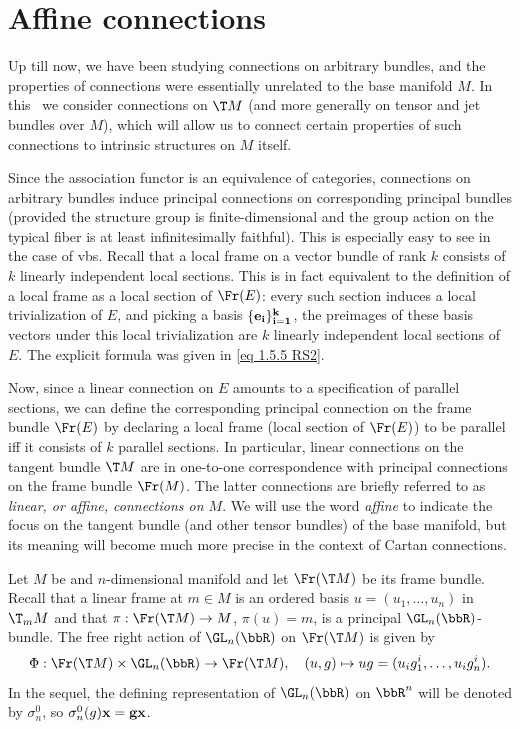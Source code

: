 \section{Affine connections}

Up till now, we have been studying connections on arbitrary bundles, and the properties of connections were essentially unrelated to the base manifold $M$. In this \sect\ we consider connections on $\T M$ (and more generally on tensor and jet bundles over $M$), which will allow us to connect certain properties of such connections to intrinsic structures on $M$ itself.

Since the association functor is an equivalence of categories, connections on arbitrary bundles induce principal connections on corresponding principal bundles (provided the structure group is finite-dimensional and the group action on the typical fiber is at least infinitesimally faithful). This is especially easy to see in the case of \glspl{vb}. Recall that a local frame on a vector bundle of rank $k$ consists of $k$ linearly independent local sections. This is in fact equivalent to the definition of a local frame as a local section of $\Fr(E)$: every such section induces a local trivialization of $E$, and picking a basis $\{\bf{e}_i\}_{i=1}^k$, the preimages of these basis vectors under this local trivialization are $k$ linearly independent local sections of $E$. The explicit formula was given in \eqref{eq 1.5.5 RS2}.

Now, since a linear connection on $E$ amounts to a specification of parallel sections, we can define the corresponding principal connection on the frame bundle $\Fr(E)$ by declaring a local frame (local section of $\Fr(E)$) to be parallel iff it consists of $k$ parallel sections. In particular, linear connections on the tangent bundle $\T M$ are in one-to-one correspondence with principal connections on the frame bundle $\Fr(M)$. The latter connections are briefly referred to as \emph{linear, or affine, connections on $M$}. We will use the word \emph{affine} to indicate the focus on the tangent bundle (and other tensor bundles) of the base manifold, but its meaning will become much more precise in the context of Cartan connections.

Let $M$ be and $n$-dimensional manifold and let $\Fr(\T M)$ be its frame bundle. Recall that a linear frame at $m\in M$ is an ordered basis $u=(u_1,\ldots,u_n)$ in $\T_m M$ and that $\pi:\Fr(\T M)\to M$, $\pi(u)=m$, is a principal $\GL_n(\bbR)$-bundle. The free right action of $\GL_n(\bbR)$ on $\Fr(\T M)$ is given by
\[\Phi:\Fr(\T M)\times \GL_n(\bbR)\to \Fr(\T M),\quad (u,g)\mapsto ug=(u_ig^i_1,\ldots,u_ig^i_n).\]
In the sequel, the defining representation of $\GL_n(\bbR)$ on $\bbR^n$ will be denoted by $\sigma^0_n$, so $\sigma^0_n(g)\bf{x}=g\bf{x}$.


